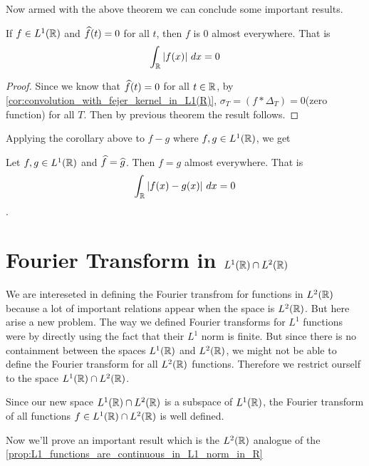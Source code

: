 Now armed with the above theorem we can conclude some important results.
\begin{corollary}
  If $f\in L^1(\mathbb R)$ and $\widehat{f}(t) = 0$ for all $t$, then $f$ is $0$ almost everywhere. That is $$\int_\R |f(x)| \ dx = 0$$
\end{corollary}
\begin{proof}
  Since we know that $\widehat{f}(t)= 0$ for all $t\in \mathbb R$, by \autoref{cor:convolution_with_fejer_kernel_in_L1(R)}, $\sigma_T = (f*\Delta_T) =0$(zero function) for all $T$. Then by previous theorem the result follows. 
\end{proof}

Applying the corollary above to $f-g$ where $f, g \in L^1(\mathbb R)$, we get
\begin{corollary}
  \label{cor:functions_with_same_fourier_transform_in_R}
  Let $f, g \in L^1(\mathbb R)$ and $\widehat{f} = \widehat{g}$. Then $f=g$ almost everywhere. That is $$\int_\mathbb R |f(x) - g(x)| \ dx = 0$$.
\end{corollary}

\section{Fourier Transform in $L^1(\mathbb R) \cap L^2(\mathbb R)$}
We are intereseted in defining the Fourier transfrom for functions in $L^2(\mathbb R)$ because a lot of important relations appear when the space is $L^2(\mathbb R)$. But here arise a new problem. The way we defined Fourier transforms for $L^1$ functions were by directly using the fact that their $L^1$ norm is finite. But since there is no containment between the spaces $L^1(\mathbb R)$ and $L^2(\mathbb R)$, we might not be able to define the Fourier transform for all $L^2(\mathbb R)$ functions. Therefore we restrict ourself to the space $L^1(\mathbb R) \cap L^2(\mathbb R)$. 

Since our new space $L^1(\mathbb R) \cap L^2(\mathbb R)$ is a subspace of $L^1(\mathbb R)$, the Fourier transform of all functions $f \in L^1(\mathbb R) \cap L^2(\mathbb R)$ is well defined. 

Now we'll prove an important result which is the $L^2(\mathbb R)$ analogue of the \autoref{prop:L1_functions_are_continuous_in_L1_norm_in_R}

